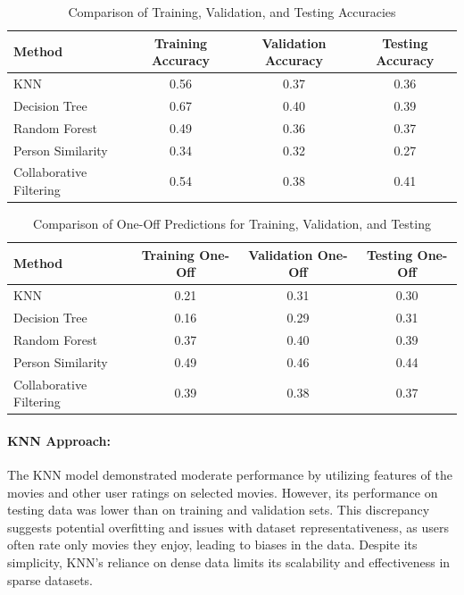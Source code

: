 \documentclass[a4paper,9pt]{article}
\begin{document}
\begin{table}[h]
    \centering
    \begin{tabular}{|l|c|c|c|}
        \hline
        \textbf{Method} & \textbf{Training Accuracy} & \textbf{Validation Accuracy} & \textbf{Testing Accuracy} \\ \hline
        KNN & 0.56 & 0.37 & 0.36 \\ \hline
        Decision Tree & 0.67 & 0.40 & 0.39 \\ \hline
        Random Forest & 0.49 & 0.36 & 0.37 \\ \hline
        Person Similarity & 0.34 & 0.32 & 0.27 \\ \hline
        Collaborative Filtering & 0.54 & 0.38 & 0.41 \\ \hline
    \end{tabular}
    \caption{Comparison of Training, Validation, and Testing Accuracies}
    \label{tab:comparison_accuracy}
\end{table}

\begin{table}[h]
    \centering
    \begin{tabular}{|l|c|c|c|}
        \hline
        \textbf{Method} & \textbf{Training One-Off} & \textbf{Validation One-Off} & \textbf{Testing One-Off} \\ \hline
        KNN & 0.21 & 0.31 & 0.30 \\ \hline
        Decision Tree & 0.16 & 0.29 & 0.31 \\ \hline
        Random Forest & 0.37 & 0.40 & 0.39 \\ \hline
        Person Similarity & 0.49 & 0.46 & 0.44 \\ \hline
        Collaborative Filtering & 0.39 & 0.38 & 0.37 \\ \hline
    \end{tabular}
    \caption{Comparison of One-Off Predictions for Training, Validation, and Testing}
    \label{tab:comparison_oneoff}
\end{table}

\paragraph{KNN Approach:}
The KNN model demonstrated moderate performance by utilizing features of the movies and other user ratings on selected movies.
However, its performance on testing data was lower than on training and validation sets.
This discrepancy suggests potential overfitting and issues with dataset representativeness, as users often rate only movies they enjoy, leading to biases in the data.
Despite its simplicity, KNN’s reliance on dense data limits its scalability and effectiveness in sparse datasets.
\end{document}
